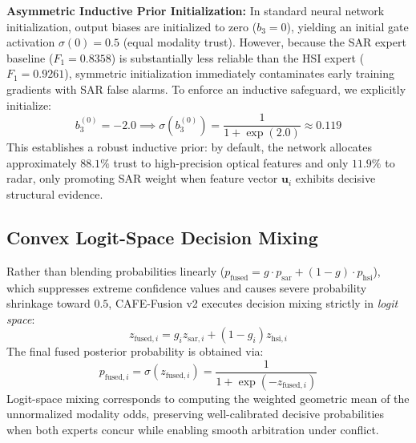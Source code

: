 \documentclass[conference]{IEEEtran}
\begin{document}
\textbf{Asymmetric Inductive Prior Initialization:} In standard neural network initialization, output biases are initialized to zero ($b_3 = 0$), yielding an initial gate activation $\sigma(0) = 0.5$ (equal modality trust). However, because the SAR expert baseline ($F_1 = 0.8358$) is substantially less reliable than the HSI expert ($F_1 = 0.9261$), symmetric initialization immediately contaminates early training gradients with SAR false alarms. To enforce an inductive safeguard, we explicitly initialize:
\begin{equation}
b_3^{(0)} = -2.0 \implies \sigma(b_3^{(0)}) = \frac{1}{1 + \exp(2.0)} \approx 0.119
\end{equation}
This establishes a robust inductive prior: by default, the network allocates approximately $88.1\%$ trust to high-precision optical features and only $11.9\%$ to radar, only promoting SAR weight when feature vector $\mathbf{u}_i$ exhibits decisive structural evidence.

\subsection{Convex Logit-Space Decision Mixing}
Rather than blending probabilities linearly ($p_{\text{fused}} = g \cdot p_{\text{sar}} + (1-g) \cdot p_{\text{hsi}}$), which suppresses extreme confidence values and causes severe probability shrinkage toward $0.5$, CAFE-Fusion v2 executes decision mixing strictly in \textit{logit space}:
\begin{equation}
\label{eq:logit_fusion}
z_{\text{fused}, i} = g_i z_{\text{sar}, i} + (1 - g_i) z_{\text{hsi}, i}
\end{equation}
The final fused posterior probability is obtained via:
\begin{equation}
p_{\text{fused}, i} = \sigma(z_{\text{fused}, i}) = \frac{1}{1 + \exp(-z_{\text{fused}, i})}
\end{equation}
Logit-space mixing corresponds to computing the weighted geometric mean of the unnormalized modality odds, preserving well-calibrated decisive probabilities when both experts concur while enabling smooth arbitration under conflict.
\end{document}
